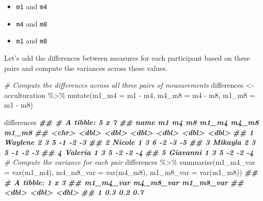 \documentclass[
]{book}
\newenvironment{Shaded}{\begin{snugshade}}{\end{snugshade}}
\newcommand{\AttributeTok}[1]{\textcolor[rgb]{0.77,0.63,0.00}{#1}}
\newcommand{\CommentTok}[1]{\textcolor[rgb]{0.56,0.35,0.01}{\textit{#1}}}
\newcommand{\DocumentationTok}[1]{\textcolor[rgb]{0.56,0.35,0.01}{\textbf{\textit{#1}}}}
\newcommand{\FunctionTok}[1]{\textcolor[rgb]{0.00,0.00,0.00}{#1}}
\newcommand{\NormalTok}[1]{#1}
\newcommand{\OtherTok}[1]{\textcolor[rgb]{0.56,0.35,0.01}{#1}}
\newcommand{\SpecialCharTok}[1]{\textcolor[rgb]{0.00,0.00,0.00}{#1}}
\begin{document}
\begin{itemize}
\item
  \texttt{m1} and \texttt{m4}
\item
  \texttt{m4} and \texttt{m8}
\item
  \texttt{m1} and \texttt{m8}
\end{itemize}

Let's add the differences between measures for each participant based on these pairs and compute the variances across these values.

\begin{Shaded}
\begin{Highlighting}[]
\CommentTok{\# Compute the differences across all three pairs of measurements}
\NormalTok{differences }\OtherTok{\textless{}{-}}\NormalTok{ acculturation }\SpecialCharTok{\%\textgreater{}\%}
  \FunctionTok{mutate}\NormalTok{(}\AttributeTok{m1\_m4 =}\NormalTok{ m1 }\SpecialCharTok{{-}}\NormalTok{ m4,}
         \AttributeTok{m4\_m8 =}\NormalTok{ m4 }\SpecialCharTok{{-}}\NormalTok{ m8,}
         \AttributeTok{m1\_m8 =}\NormalTok{ m1 }\SpecialCharTok{{-}}\NormalTok{ m8)}

\NormalTok{differences}
\DocumentationTok{\#\# \# A tibble: 5 x 7}
\DocumentationTok{\#\#   name        m1    m4    m8 m1\_m4 m4\_m8 m1\_m8}
\DocumentationTok{\#\#   \textless{}chr\textgreater{}    \textless{}dbl\textgreater{} \textless{}dbl\textgreater{} \textless{}dbl\textgreater{} \textless{}dbl\textgreater{} \textless{}dbl\textgreater{} \textless{}dbl\textgreater{}}
\DocumentationTok{\#\# 1 Waylene      2     3     5    {-}1    {-}2    {-}3}
\DocumentationTok{\#\# 2 Nicole       1     3     6    {-}2    {-}3    {-}5}
\DocumentationTok{\#\# 3 Mikayla      2     3     5    {-}1    {-}2    {-}3}
\DocumentationTok{\#\# 4 Valeria      1     3     5    {-}2    {-}2    {-}4}
\DocumentationTok{\#\# 5 Giavanni     1     3     5    {-}2    {-}2    {-}4}
\CommentTok{\# Compute the variance for each pair}
\NormalTok{differences }\SpecialCharTok{\%\textgreater{}\%}
  \FunctionTok{summarise}\NormalTok{(}\AttributeTok{m1\_m4\_var =} \FunctionTok{var}\NormalTok{(m1\_m4),}
            \AttributeTok{m4\_m8\_var =} \FunctionTok{var}\NormalTok{(m4\_m8),}
            \AttributeTok{m1\_m8\_var =} \FunctionTok{var}\NormalTok{(m1\_m8))}
\DocumentationTok{\#\# \# A tibble: 1 x 3}
\DocumentationTok{\#\#   m1\_m4\_var m4\_m8\_var m1\_m8\_var}
\DocumentationTok{\#\#       \textless{}dbl\textgreater{}     \textless{}dbl\textgreater{}     \textless{}dbl\textgreater{}}
\DocumentationTok{\#\# 1       0.3       0.2       0.7}
\end{Highlighting}
\end{Shaded}
\end{document}
